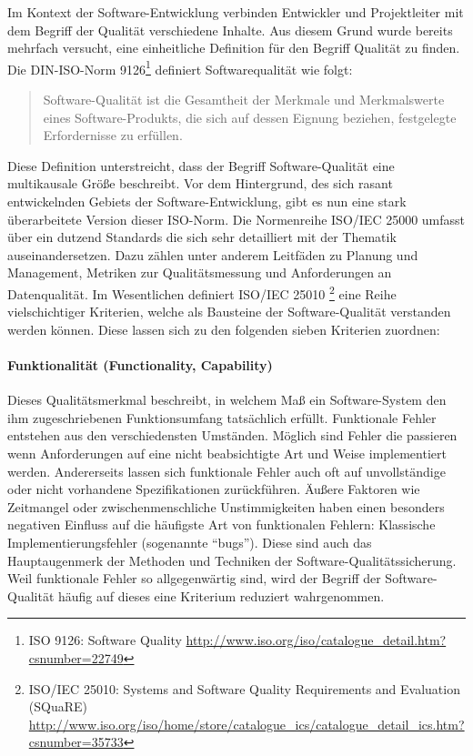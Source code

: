 Im Kontext der Software-Entwicklung verbinden Entwickler und Projektleiter mit dem Begriff der Qualität verschiedene Inhalte\cite{hoffmann_software-qualitat_2013}. Aus diesem Grund wurde bereits mehrfach versucht, eine einheitliche Definition für den Begriff Qualität zu finden. Die DIN-ISO-Norm 9126\footnote{ISO 9126: Software Quality \url{http://www.iso.org/iso/catalogue_detail.htm?csnumber=22749}} definiert Softwarequalität wie folgt:

\begin{quote}
Software-Qualität ist die Gesamtheit der Merkmale und Merkmalswerte eines Software-Produkts, die sich auf dessen Eignung beziehen, festgelegte Erfordernisse zu erfüllen.
\end{quote}

Diese Definition unterstreicht, dass der Begriff Software-Qualität eine multikausale Größe beschreibt\cite{hoffmann_software-qualitat_2013}. Vor dem Hintergrund, des sich rasant entwickelnden Gebiets der Software-Entwicklung, gibt es nun eine stark überarbeitete Version dieser ISO-Norm. Die Normenreihe ISO/IEC 25000 umfasst über ein dutzend Standards die sich sehr detailliert mit der Thematik auseinandersetzen. Dazu zählen unter anderem Leitfäden zu Planung und Management, Metriken zur Qualitätsmessung und Anforderungen an Datenqualität. Im Wesentlichen definiert ISO/IEC 25010 \footnote{ISO/IEC 25010: Systems and Software Quality Requirements and Evaluation (SQuaRE) \url{http://www.iso.org/iso/home/store/catalogue_ics/catalogue_detail_ics.htm?csnumber=35733}} eine Reihe vielschichtiger Kriterien, welche als Bausteine der Software-Qualität verstanden werden können. Diese lassen sich zu den folgenden sieben Kriterien zuordnen:

\paragraph{Funktionalität (Functionality, Capability)} Dieses Qualitätsmerkmal beschreibt, in welchem Maß ein Software-System den ihm zugeschriebenen Funktionsumfang tatsächlich erfüllt. Funktionale Fehler entstehen aus den verschiedensten Umständen. Möglich sind Fehler die passieren wenn Anforderungen auf eine nicht beabsichtigte Art und Weise implementiert werden. Andererseits lassen sich funktionale Fehler auch oft auf unvollständige oder nicht vorhandene Spezifikationen zurückführen. Äußere Faktoren wie Zeitmangel oder zwischenmenschliche Unstimmigkeiten haben einen besonders negativen Einfluss auf die häufigste Art von funktionalen Fehlern: Klassische Implementierungsfehler (sogenannte ``bugs''). Diese sind auch das Hauptaugenmerk der Methoden und Techniken der Software-Qualitätssicherung. Weil funktionale Fehler so allgegenwärtig sind, wird der Begriff der Software-Qualität häufig auf dieses eine Kriterium reduziert wahrgenommen.

